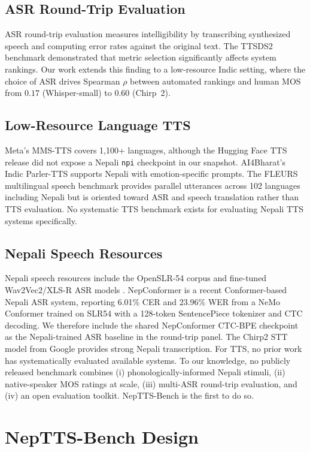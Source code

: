 \documentclass[11pt]{article}
\begin{document}
\subsection{ASR Round-Trip Evaluation}
ASR round-trip evaluation measures intelligibility by transcribing synthesized speech and computing error rates against the original text. The TTSDS2 benchmark \citep{minixhofer2025ttsds} demonstrated that metric selection significantly affects system rankings. Our work extends this finding to a low-resource Indic setting, where the choice of ASR drives Spearman $\rho$ between automated rankings and human MOS from $0.17$ (Whisper-small) to $0.60$ (Chirp~2).

\subsection{Low-Resource Language TTS}
Meta's MMS-TTS \citep{pratap2023mms} covers 1,100+ languages, although the Hugging Face TTS release did not expose a Nepali \texttt{npi} checkpoint in our snapshot. AI4Bharat's Indic Parler-TTS supports Nepali with emotion-specific prompts. The FLEURS multilingual speech benchmark \citep{conneau2022fleurs} provides parallel utterances across 102 languages including Nepali but is oriented toward ASR and speech translation rather than TTS evaluation. No systematic TTS benchmark exists for evaluating Nepali TTS systems specifically.

\subsection{Nepali Speech Resources}
Nepali speech resources include the OpenSLR-54 corpus and fine-tuned Wav2Vec2/XLS-R ASR models \citep{gagan2023xlsr}. NepConformer \citep{poudel2026nepconformer} is a recent Conformer-based Nepali ASR system, reporting 6.01\% CER and 23.96\% WER from a NeMo Conformer trained on SLR54 with a 128-token SentencePiece tokenizer and CTC decoding. We therefore include the shared NepConformer CTC-BPE checkpoint as the Nepali-trained ASR baseline in the round-trip panel. The Chirp2 STT model from Google provides strong Nepali transcription. For TTS, no prior work has systematically evaluated available systems. To our knowledge, no publicly released benchmark combines (i) phonologically-informed Nepali stimuli, (ii) native-speaker MOS ratings at scale, (iii) multi-ASR round-trip evaluation, and (iv) an open evaluation toolkit. NepTTS-Bench is the first to do so.

\section{NepTTS-Bench Design}
\end{document}
